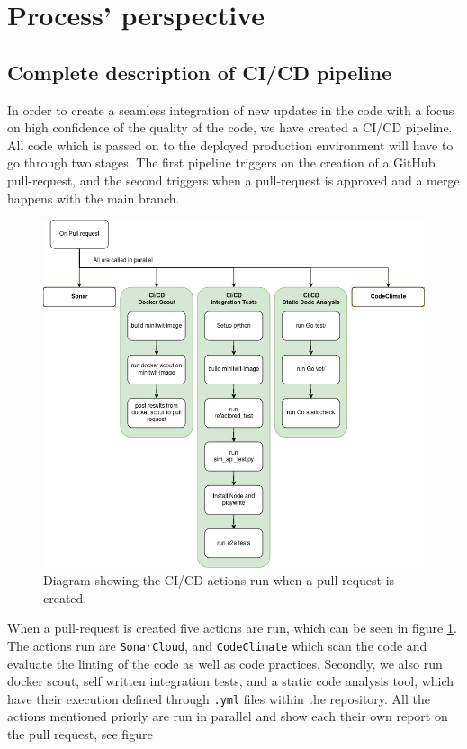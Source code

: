 \section{Process' perspective}
\subsection{Complete description of CI/CD pipeline}
In order to create a seamless integration of new updates in the code with a focus on high confidence of the quality of the code, we have created a CI/CD pipeline. All code which is passed on to the deployed production environment will have to go through two stages. The first pipeline triggers on the creation of a GitHub pull-request, and the second triggers when a pull-request is approved and a merge happens with the main branch. 
\begin{figure}[H]
    \centering
    \includegraphics[scale=.5]{diagrams/PullRequest_CICD.png}
    \caption{Diagram showing the CI/CD actions run when a pull request is created.}
    \label{fig:pull request ci/cd}
\end{figure}
When a pull-request is created five actions are run, which can be seen in figure \ref{fig:pull request ci/cd}. The actions run are \texttt{SonarCloud}, and \texttt{CodeClimate} which scan the code and evaluate the linting of the code as well as code practices. Secondly, we also run docker scout, self written integration tests, and a static code analysis tool, which have their execution defined through \texttt{.yml} files within the repository. All the actions mentioned priorly are run in parallel and show each their own report on the pull request, see figure  
